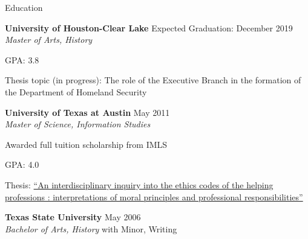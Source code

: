 \documentclass{resume} %
\begin{document}

\begin{rSection}{Education}
\raggedright
{\bf University of Houston-Clear Lake} \hfill{Expected Graduation: December 2019} \\
\textit{Master of Arts, History}
\begin{rSubsectionEd}
	\item GPA: 3.8
	\item Thesis topic (in progress): The role of the Executive Branch in the formation of the Department of Homeland Security
\end{rSubsectionEd}
{\bf University of Texas at Austin} \hfill {May 2011} \\ 
\textit{Master of Science, Information Studies}
\begin{rSubsectionEd}
	\item Awarded full tuition scholarship from IMLS
	\item GPA: 4.0
	\item Thesis: \href{http://hdl.handle.net/2152/ETD-UT-2011-05-3522}{``An interdisciplinary inquiry into the ethics codes of the helping professions : interpretations of moral principles and professional responsibilities''} \\	
\end{rSubsectionEd}

{\bf Texas State University} \hfill {May 2006} \\ 
\textit{Bachelor of Arts, History} with Minor, Writing 

\end{rSection}

\end{document}
